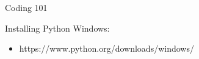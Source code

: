 \documentclass[xcolor=dvipsnames]{beamer}
\begin{document}
\begin{frame}
    \begin{center}
        \Large{Coding 101}
    \end{center}
\end{frame}
\begin{frame}{Installing Python}
  Windows:
  \begin{itemize}
     \item https://www.python.org/downloads/windows/
  \end{itemize}
\end{frame}
\begin{frame}
\end{frame}
\end{document}
